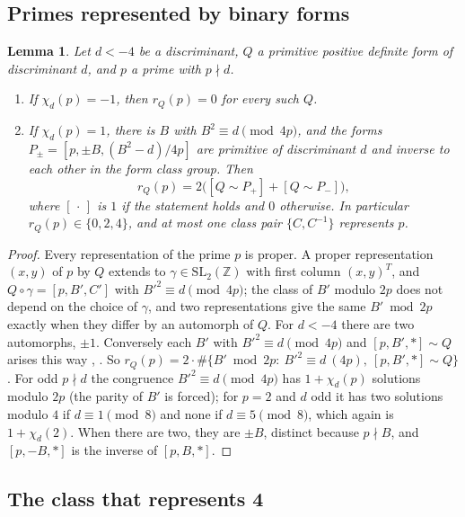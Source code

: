\documentclass[11pt]{amsart}
\newtheorem{lemma}{Lemma}[section]
\theoremstyle{definition}
\theoremstyle{remark}
\newcommand{\Z}{\mathbb{Z}}
\newcommand{\form}[3]{[#1,#2,#3]}
\begin{document}
\subsection{Primes represented by binary forms}

\begin{lemma}\label{lem:primes}
Let $d<-4$ be a discriminant, $Q$ a primitive positive definite form of discriminant $d$, and $p$ a prime with $p\nmid d$.
\begin{enumerate}
\item If $\chi_d(p)=-1$, then $r_Q(p)=0$ for every such $Q$.
\item If $\chi_d(p)=1$, there is $B$ with $B^2\equiv d\pmod{4p}$, and the forms $P_\pm=\form{p}{\pm B}{(B^2-d)/4p}$ are primitive of discriminant $d$ and inverse to each other in the form class group. Then
\[
r_Q(p)=2\bigl([Q\sim P_+]+[Q\sim P_-]\bigr),
\]
where $[\,\cdot\,]$ is $1$ if the statement holds and $0$ otherwise. In particular $r_Q(p)\in\{0,2,4\}$, and at most one class pair $\{C,C^{-1}\}$ represents $p$.
\end{enumerate}
\end{lemma}

\begin{proof}
Every representation of the prime $p$ is proper. A proper representation $(x,y)$ of $p$ by $Q$ extends to $\gamma\in\mathrm{SL}_2(\Z)$ with first column $(x,y)^T$, and $Q\circ\gamma=\form{p}{B'}{C'}$ with $B'^2\equiv d\pmod{4p}$; the class of $B'$ modulo $2p$ does not depend on the choice of $\gamma$, and two representations give the same $B'\bmod 2p$ exactly when they differ by an automorph of $Q$. For $d<-4$ there are two automorphs, $\pm1$. Conversely each $B'$ with $B'^2\equiv d\pmod{4p}$ and $\form{p}{B'}{*}\sim Q$ arises this way \cite[\S2]{Cox}, \cite[Ch.~2]{Bu}. So $r_Q(p)=2\cdot\#\{B'\bmod 2p:\ B'^2\equiv d\ (4p),\ \form{p}{B'}{*}\sim Q\}$. For odd $p\nmid d$ the congruence $B'^2\equiv d\pmod{4p}$ has $1+\chi_d(p)$ solutions modulo $2p$ (the parity of $B'$ is forced); for $p=2$ and $d$ odd it has two solutions modulo $4$ if $d\equiv1\pmod8$ and none if $d\equiv5\pmod 8$, which again is $1+\chi_d(2)$. When there are two, they are $\pm B$, distinct because $p\nmid B$, and $\form{p}{-B}{*}$ is the inverse of $\form{p}{B}{*}$.
\end{proof}

\subsection{The class that represents 4}
\end{document}
